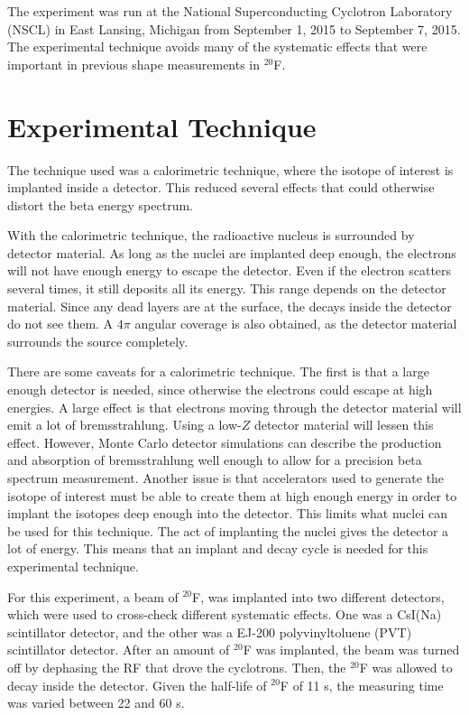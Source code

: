 \documentclass[../MaxHughesThesis.tex]{subfiles}
\begin{document}
The experiment was run at the National Superconducting Cyclotron Laboratory (NSCL) in East Lansing, Michigan from September 1, 2015 to September 7, 2015.
The experimental technique avoids many of the systematic effects that were important in previous shape measurements in  $^{20}$F.

\section{Experimental Technique}
The technique used was a calorimetric technique, where the isotope of interest is implanted inside a detector.
This reduced several effects that could otherwise distort the beta energy spectrum.

With the calorimetric technique, the radioactive nucleus is surrounded by detector material.
As long as the nuclei are implanted deep enough, the electrons will not have enough energy to escape the detector.
Even if the electron scatters several times, it still deposits all its energy.
This range depends on the detector material.
Since any dead layers are at the surface, the decays inside the detector do not see them.
A $4\pi$ angular coverage is also obtained, as the detector material surrounds the source completely.

There are some caveats for a calorimetric technique. 
The first is that a large enough detector is needed, since otherwise the electrons could escape at high energies.
A large effect is that electrons moving through the detector material will emit a lot of bremsstrahlung.
Using a low-$Z$ detector material will lessen this effect.
However, Monte Carlo detector simulations can describe the production and absorption of bremsstrahlung well enough to allow for a precision beta spectrum measurement. 
Another issue is that accelerators used to generate the isotope of interest must be able to create them at high enough energy in order to implant the isotopes deep enough into the detector.
This limits what nuclei can be used for this technique.
The act of implanting the nuclei gives the detector a lot of energy. 
This means that an implant and decay cycle is needed for this experimental technique.

For this experiment, a  beam of  $^{20}$F, was implanted into two different detectors, which were used to cross-check different systematic effects.
One was a CsI(Na) scintillator detector, and the other was a  EJ-200 polyvinyltoluene (PVT) scintillator detector. 
After an amount of $^{20}$F was implanted, the beam was turned off by dephasing the RF that drove the cyclotrons.
Then, the $^{20}$F was allowed to decay inside the detector. 
Given the half-life of $^{20}$F of 11 s, the measuring time was varied between 22 and 60 s.
\end{document}

